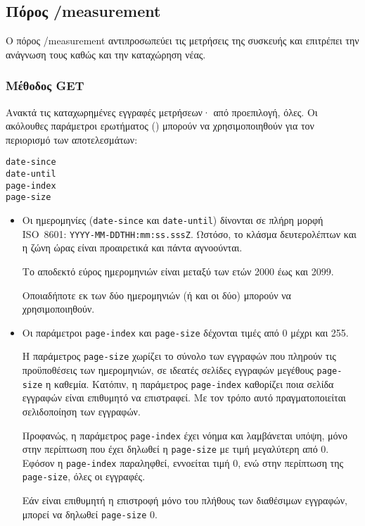 \subsection{Πόρος /measurement}
\label{subsec:network:measurement}

Ο πόρος /measurement αντιπροσωπεύει τις μετρήσεις της συσκευής και επιτρέπει
την ανάγνωση τους καθώς και την καταχώρηση νέας.


\subsubsection{Μέθοδος GET}

Ανακτά τις καταχωρημένες εγγραφές μετρήσεων· από προεπιλογή, όλες. Οι ακόλουθες
παράμετροι ερωτήματος () μπορούν να χρησιμοποιηθούν για τον
περιορισμό των αποτελεσμάτων:
\begin{lstlisting}
date-since
date-until
page-index
page-size
\end{lstlisting}
\begin{itemize}
    \item Οι ημερομηνίες (\verb~date-since~ και \verb~date-until~) δίνονται σε
    πλήρη μορφή ISO~8601: \verb~YYYY-MM-DDTHH:mm:ss.sssZ~. Ωστόσο, το κλάσμα
    δευτερολέπτων και η ζώνη ώρας είναι προαιρετικά και πάντα αγνοούνται.

    Το αποδεκτό εύρος ημερομηνιών είναι μεταξύ των ετών 2000 έως και 2099.

    Οποιαδήποτε εκ των δύο ημερομηνιών (ή και οι δύο) μπορούν να
    χρησιμοποιηθούν.

    \item Οι παράμετροι \verb~page-index~ και \verb~page-size~ δέχονται τιμές
    από 0 μέχρι και 255.

    Η παράμετρος \verb~page-size~ χωρίζει το σύνολο των εγγραφών που πληρούν
    τις προϋποθέσεις των ημερομηνιών, σε ιδεατές σελίδες εγγραφών μεγέθους
    \verb~page-size~ η καθεμία. Κατόπιν, η παράμετρος \verb~page-index~
    καθορίζει ποια σελίδα εγγραφών είναι επιθυμητό να επιστραφεί. Με τον τρόπο
    αυτό πραγματοποιείται σελιδοποίηση των εγγραφών.

    Προφανώς, η παράμετρος \verb~page-index~ έχει νόημα και λαμβάνεται υπόψη,
    μόνο στην περίπτωση που έχει δηλωθεί η \verb~page-size~ με τιμή μεγαλύτερη
    από 0. Εφόσον η \verb~page-index~ παραληφθεί, εννοείται τιμή 0, ενώ στην
    περίπτωση της \verb~page-size~, όλες οι εγγραφές.

    Εάν είναι επιθυμητή η επιστροφή μόνο του πλήθους των διαθέσιμων εγγραφών,
    μπορεί να δηλωθεί \verb~page-size~ 0.
\end{itemize}

